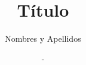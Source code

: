 \documentclass[11pt,openany,final]{unsa}
\title{Título}
\author{Nombres y Apellidos}%
\date{-}
\begin{document}


\begin{frontmatter}
\dedicatory
\begin{singlespace}
\tableofcontents \listoffigures \listoftables \pagebreak
\end{singlespace}
%
\end{frontmatter}%

\pagestyle{fancyplain}






%
%

\begin{singlespace}
\end{singlespace}
\end{document}
